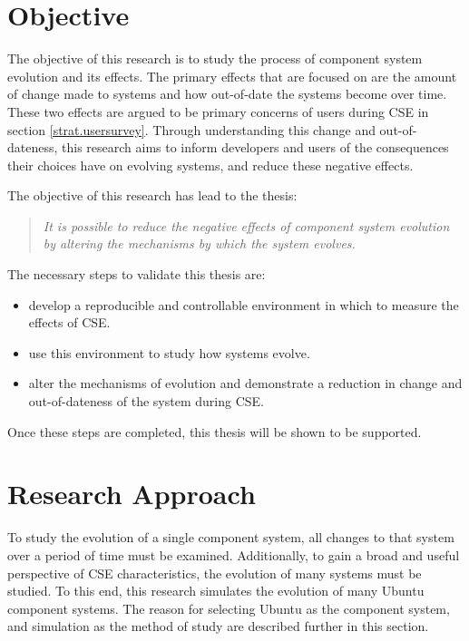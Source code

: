 \section{Objective}
The objective of this research is to study the process of component system evolution and its effects.
The primary effects that are focused on are the amount of change made to systems and how out-of-date the systems become over time.
These two effects are argued to be primary concerns of users during CSE in section \ref{strat.usersurvey}.
Through understanding this change and out-of-dateness,
this research aims to inform developers and users of the consequences their choices have on evolving systems,
and reduce these negative effects.

The objective of this research has lead to the thesis:
\begin{quote}
\textit{It is possible to reduce the negative effects of component system evolution by altering the mechanisms by which the system evolves.} 
\end{quote}

The necessary steps to validate this thesis are:
\begin{itemize}
  \item develop a reproducible and controllable environment in which to measure the effects of CSE.
  \item use this environment to study how systems evolve.
  \item alter the mechanisms of evolution and demonstrate a reduction in change and out-of-dateness of the system during CSE.
\end{itemize}

Once these steps are completed, this thesis will be shown to be supported.  

\section{Research Approach}
To study the evolution of a single component system, all changes to that system over a period of time must be examined.
Additionally, to gain a broad and useful perspective of CSE characteristics, the evolution of many systems must be studied.
To this end, this research simulates the evolution of many Ubuntu component systems.
The reason for selecting Ubuntu as the component system, and simulation as the method of study are described further in this section.

